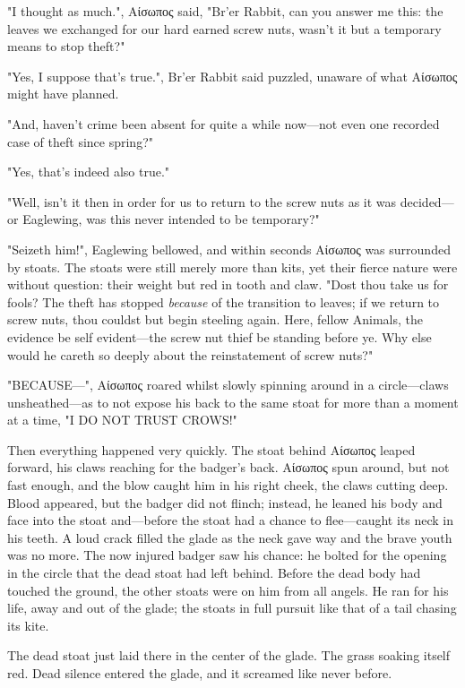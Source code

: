 "I thought as much.", Αίσωπος said, "Br'er Rabbit, can you answer me this: the leaves we exchanged for our hard earned screw nuts, wasn't it but a temporary means to stop theft?" 

"Yes, I suppose that's true.", Br'er Rabbit said puzzled, unaware of what Αίσωπος might have planned.

"And, haven't crime been absent for quite a while now---not even one recorded case of theft since spring?"

"Yes, that's indeed also true."

"Well, isn't it then in order for us to return to the screw nuts as it was decided---or Eaglewing, was this never intended to be temporary?"

"Seizeth him!", Eaglewing bellowed, and within seconds Αίσωπος was surrounded by stoats. The stoats were still merely more than kits, yet their fierce nature were without question: their weight but red in tooth and claw. "Dost thou take us for fools? The theft has stopped \textit{because} of the transition to leaves; if we return to screw nuts, thou couldst but begin steeling again. Here, fellow Animals, the evidence be self evident---the screw nut thief be standing before ye. Why else would he careth so deeply about the reinstatement of screw nuts?"

"BECAUSE---", Αίσωπος roared whilst slowly spinning around in a circle---claws unsheathed---as to not expose his back to the same stoat for more than a moment at a time, "I DO NOT TRUST CROWS!"

Then everything happened very quickly. The stoat behind Αίσωπος leaped forward, his claws reaching for the badger's back. Αίσωπος spun around, but not fast enough, and the blow caught him in his right cheek, the claws cutting deep. Blood appeared, but the badger did not flinch; instead, he leaned his body and face into the stoat and---before the stoat had a chance to flee---caught its neck in his teeth. A loud crack filled the glade as the neck gave way and the brave youth was no more. The now injured badger saw his chance: he bolted for the opening in the circle that the dead stoat had left behind. Before the dead body had touched the ground, the other stoats were on him from all angels. He ran for his life, away and out of the glade; the stoats in full pursuit like that of a tail chasing its kite.

The dead stoat just laid there in the center of the glade. The grass soaking itself red. Dead silence entered the glade, and it screamed like never before.


